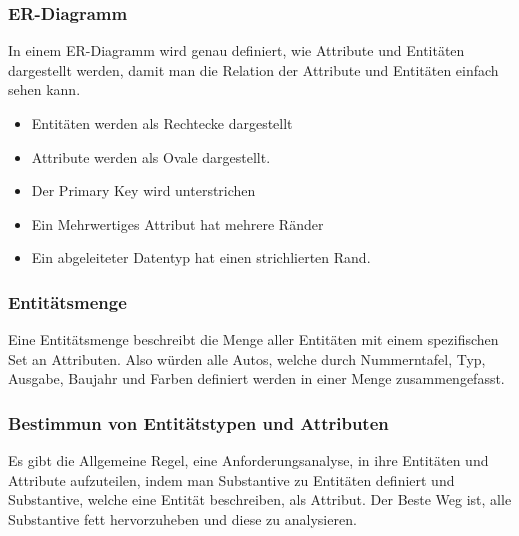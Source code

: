 \documentclass{article}
\begin{document}
	\subsubsection{ER-Diagramm}
	In einem ER-Diagramm wird genau definiert, wie Attribute und Entitäten dargestellt werden, damit man die Relation der Attribute und Entitäten einfach sehen kann. \\
	\begin{itemize}
		\item{Entitäten werden als Rechtecke dargestellt}
		\item{Attribute werden als Ovale dargestellt.}
		\item{Der Primary Key wird unterstrichen}
		\item{Ein Mehrwertiges Attribut hat mehrere Ränder}
		\item{Ein abgeleiteter Datentyp hat einen strichlierten Rand.}
	\end{itemize}
	\subsubsection{Entitätsmenge}
	Eine Entitätsmenge beschreibt die Menge aller Entitäten mit einem spezifischen Set an Attributen. Also würden alle Autos, welche durch Nummerntafel, Typ, Ausgabe, Baujahr und Farben definiert werden in einer Menge zusammengefasst.
	\subsubsection{Bestimmun von Entitätstypen und Attributen}
	Es gibt die Allgemeine Regel, eine Anforderungsanalyse, in ihre Entitäten und Attribute aufzuteilen, indem man Substantive zu Entitäten definiert und Substantive, welche eine Entität beschreiben, als Attribut. Der Beste Weg ist, alle Substantive fett hervorzuheben und diese zu analysieren.
\end{document}
